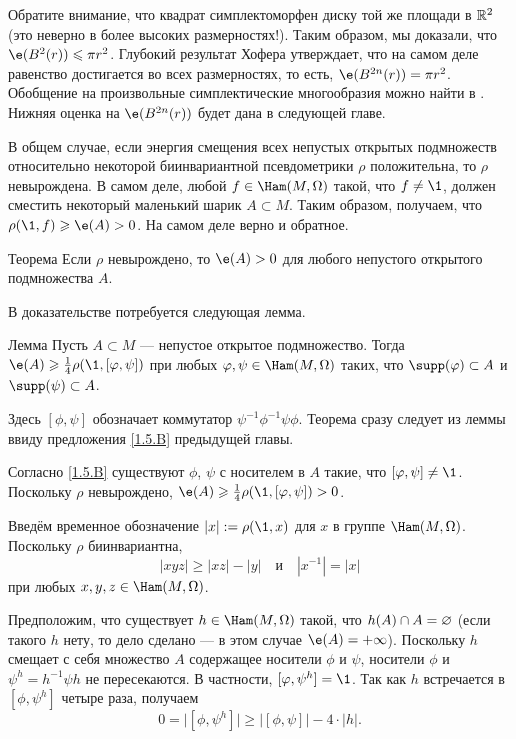 Обратите внимание, что квадрат симплектоморфен диску той же площади в $\mathbb{R}^2$ (это неверно в более высоких размерностях!).
Таким образом, мы доказали, что $\e (B^2 (r)) \le \pi r^2$.
Глубокий результат Хофера \cite{H1} утверждает, что на самом деле равенство
достигается во всех размерностях, то есть, $\e (B^{2n} (r)) = \pi r^2$.
Обобщение на произвольные симплектические многообразия можно найти в \cite{LM1}.
Нижняя оценка на $\e(B^{2n} (r))$ будет дана в следующей главе.

В общем случае, если энергия смещения всех непустых открытых подмножеств относительно некоторой биинвариантной псевдометрики $\rho$ положительна, то $\rho$ невырождена.
В самом деле, любой $f \in \Ham (M, \Omega)$ такой, что $f \ne \1$,
должен сместить некоторый маленький шарик $A \subset M$.
Таким образом, получаем, что $\rho (\1, f) \ge \e (A)> 0$.
На самом деле верно и обратное.

\begin{thm}[(\cite{EP})]{Теорема}\label{2.4.A}
Если $\rho$ невырождено, то $\e (A)> 0$ для любого непустого открытого подмножества $A$.
\end{thm}

В доказательстве потребуется следующая лемма.

\begin{thm}{Лемма}\label{2.4.B}
Пусть $A \subset M$ — непустое открытое подмножество.
Тогда $\e (A) \ge \tfrac14 \rho (\1, [\phi, \psi])$ при любых $\phi, \psi \in \Ham (M, \Omega)$ таких, что $\supp (\phi) \subset A$ и $\supp (\psi) \subset A$.
\end{thm}

Здесь $[\phi, \psi]$ обозначает коммутатор $\psi^{-1} \phi^{-1} \psi\phi$.
Теорема сразу следует из леммы ввиду предложения \ref{1.5.B} предыдущей главы.

Согласно \ref{1.5.B} существуют $\phi$, $\psi$ с носителем в $A$ такие, что $[\phi, \psi] \ne \1$.
Поскольку $\rho$ невырождено, $\e (A) \z\ge \tfrac14 \rho (\1, [\phi, \psi])> 0$.
\qeds


Введём временное обозначение $|x|\z\df\rho(\1,x)$
для $x$ в группе $\Ham (M, \Omega)$.
Поскольку $\rho$ биинвариантна,
\[
|xyz|
\ge
|xz|-|y|
\quad\text{и}\quad
|x^{-1}|=|x|
\]
при любых $x,y,z\in \Ham (M, \Omega)$.

Предположим, что существует $h \in \Ham (M, \Omega)$ такой, что $h (A) \z\cap A \z= \emptyset$ (если такого $h$ нету, то дело сделано — в этом случае $\e (A) \z= + \infty$).
Поскольку $h$ смещает с себя множество $A$ содержащее носители $\phi$ и $\psi$,
носители $\phi$ и $\psi^{h}=h^{-1} \psi h$ не пересекаются.
В частности, $[\phi,\psi^{h}]=\1$.
Так как $h$ встречается в $[\phi,\psi^{h}]$ четыре раза, получаем
\[
0=\big|[\phi,\psi^{h}]\big|
\ge
\big|[\phi,\psi]\big| - 4\cdot|h|.
\]
\qedsf


